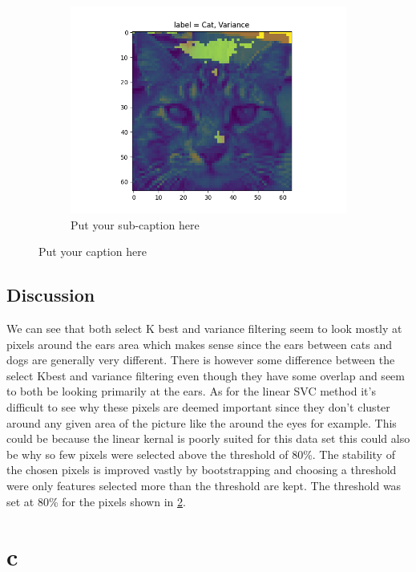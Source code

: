 \documentclass{article}
\begin{document}
\begin{figure}[ht]
\begin{subfigure}{.33\textwidth}
  \includegraphics[width=1\linewidth]{1b/Imp_feat_var.png}  
  \caption{Put your sub-caption here}
  \label{fig:sub-second}
\end{subfigure}
\caption{Put your caption here}
\label{imp pixels}
\end{figure}
\subsection{Discussion}
We can see that both select K best and variance filtering seem to look mostly at pixels around the ears area which makes sense since the ears between cats and dogs are generally very different. There is however some difference between the select Kbest and variance filtering even though they have some overlap and seem to both be looking primarily at the ears. As for the linear SVC method it's difficult to see why these pixels are deemed important since they don't cluster around any given area of the picture like the around the eyes for example. This could be because the linear kernal is poorly suited for this data set this could also be why so few pixels were selected above the threshold of 80\%.  The stability of the chosen pixels is improved vastly by bootstrapping and choosing a threshold were only features selected more than the threshold are kept. The threshold was set at 80\% for the pixels shown in \ref{imp pixels}. 
\newpage
\section{c}
\end{document}
